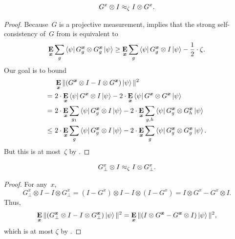 \begin{lemma}\label{lem:g-complete-self-consistency}
\begin{equation*}
G^{x} \otimes I \approx_{\zeta}  I \otimes G^{x}.
\end{equation*}
\end{lemma}
\begin{proof}
Because~$G$ is a projective measurement, 
implies that the strong self-consistency of~$G$ from  is equivalent to 
\begin{equation}\label{eq:ld-g-self-consistency}
\mathop{\bf E\/}_{{\boldsymbol{x}}} \sum_{g} \bra{\psi} G^{{\boldsymbol{x}}}_{g} \otimes G^{{\boldsymbol{x}}}_{g}
    \ket{\psi} \geq \mathop{\bf E\/}_{{\boldsymbol{x}}} \sum_{g} \bra{\psi} G^{{\boldsymbol{x}}}_{g} \otimes
                 I\ket{\psi} - \frac{1}{2}\cdot \zeta.
\end{equation}
Our goal is to bound
\begin{align*}
&\mathop{\bf E\/}_{{\boldsymbol{x}}} \Vert (G^{{\boldsymbol{x}}}\otimes I - I \otimes G^{{\boldsymbol{x}}}) \ket{\psi} \Vert^2\\
=~&2\cdot \mathop{\bf E\/}_{{\boldsymbol{x}}} \bra{\psi} G^{{\boldsymbol{x}}} \otimes I \ket{\psi} - 2\cdot \mathop{\bf E\/}_{{\boldsymbol{x}}} \bra{\psi} G^{{\boldsymbol{x}}} \otimes G^{{\boldsymbol{x}}} \ket{\psi}\\
=~&2\cdot \mathop{\bf E\/}_{{\boldsymbol{x}}} \sum_{g_1} \bra{\psi} G^{{\boldsymbol{x}}}_{g} \otimes I \ket{\psi} - 2\cdot \mathop{\bf E\/}_{{\boldsymbol{x}}} \sum_{g, h} \bra{\psi} G^{{\boldsymbol{x}}}_{g} \otimes G^{{\boldsymbol{x}}}_{h} \ket{\psi}\\
\leq~&2\cdot \mathop{\bf E\/}_{{\boldsymbol{x}}} \sum_{g} \bra{\psi} G^{{\boldsymbol{x}}}_{g} \otimes I \ket{\psi} - 2\cdot \mathop{\bf E\/}_{{\boldsymbol{x}}} \sum_{g} \bra{\psi} G^{{\boldsymbol{x}}}_{g} \otimes G^{{\boldsymbol{x}}}_{g} \ket{\psi}.
\end{align*}
But this is at most~$\zeta$ by .
\end{proof}

\begin{corollary}\label{cor:g-bot-self-consistency}
\begin{equation*}
G^{x}_{\bot} \otimes I \approx_{\zeta}  I \otimes G^{x}_{\bot}.
\end{equation*}
\end{corollary}
\begin{proof}
 For any~$x$,
 \begin{equation*}
 G^x_{\bot} \otimes I - I \otimes G^x_{\bot}
 = (I - G^x) \otimes I - I \otimes (I - G^x)
 = I \otimes G^x - G^x \otimes I.
 \end{equation*}
Thus,
\begin{equation*}
\mathop{\bf E\/}_{{\boldsymbol{x}}}  \| (G^{{\boldsymbol{x}}}_{\bot} \otimes I -I \otimes
      G^{{\boldsymbol{x}}}_{\bot}) \ket{\psi} \|^2
= \mathop{\bf E\/}_{{\boldsymbol{x}}}  \| (I \otimes G^{{\boldsymbol{x}}} - G^{{\boldsymbol{x}}} \otimes I) \ket{\psi} \|^2,
\end{equation*}
which is at most $\zeta$ by .
\end{proof}

